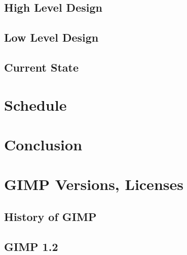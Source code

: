 \documentclass{report}
\begin{document}
\section{High Level Design}
\label{sec:High_Level_Design}


\section{Low Level Design}
\label{sec:Low_Level_Design}


\section{Current State}
\label{sec:Current_State}



\chapter{Schedule}
\label{ch:Schedule}



\chapter{Conclusion}
\label{ch:Conclusion}



\appendix


\chapter{GIMP Versions, Licenses}
\label{ch:GIMP_Versions_Licences}

\section{History of GIMP}
\label{sec:History_of_GIMP} 


\section{GIMP 1.2}
\label{sec:GIMP_1.2}

\end{document}
